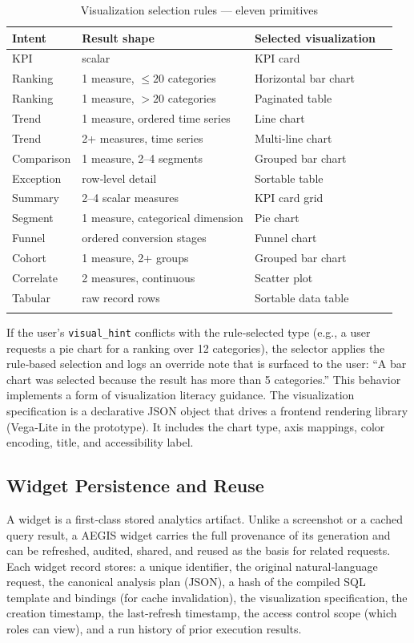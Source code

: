 \documentclass[11pt]{article}
\begin{document}
\begin{longtable}{llll}
\toprule
\textbf{Intent} & \textbf{Result shape} & \textbf{Selected visualization}\\
\midrule
KPI & scalar & KPI card\\
Ranking & 1 measure, $\leq20$ categories & Horizontal bar chart\\
Ranking & 1 measure, $>20$ categories & Paginated table\\
Trend & 1 measure, ordered time series & Line chart\\
Trend & 2+ measures, time series & Multi‑line chart\\
Comparison & 1 measure, 2–4 segments & Grouped bar chart\\
Exception & row‑level detail & Sortable table\\
Summary & 2–4 scalar measures & KPI card grid\\
Segment & 1 measure, categorical dimension & Pie chart\\
Funnel & ordered conversion stages & Funnel chart\\
Cohort & 1 measure, 2+ groups & Grouped bar chart\\
Correlate & 2 measures, continuous & Scatter plot\\
Tabular & raw record rows & Sortable data table\\
\bottomrule
\caption{Visualization selection rules --- eleven primitives}\label{tab:viz}
\end{longtable}

If the user's \texttt{visual\_hint} conflicts with the rule‑selected type (e.g., a user requests a pie chart for a ranking over 12 categories), the selector applies the rule‑based selection and logs an override note that is surfaced to the user: ``A bar chart was selected because the result has more than 5 categories.'' This behavior implements a form of visualization literacy guidance. The visualization specification is a declarative JSON object that drives a frontend rendering library (Vega‑Lite in the prototype). It includes the chart type, axis mappings, color encoding, title, and accessibility label.

\subsection{Widget Persistence and Reuse\label{sec:widget}}
A widget is a first‑class stored analytics artifact. Unlike a screenshot or a cached query result, a AEGIS widget carries the full provenance of its generation and can be refreshed, audited, shared, and reused as the basis for related requests. Each widget record stores: a unique identifier, the original natural‑language request, the canonical analysis plan (JSON), a hash of the compiled SQL template and bindings (for cache invalidation), the visualization specification, the creation timestamp, the last‑refresh timestamp, the access control scope (which roles can view), and a run history of prior execution results.
\end{document}

